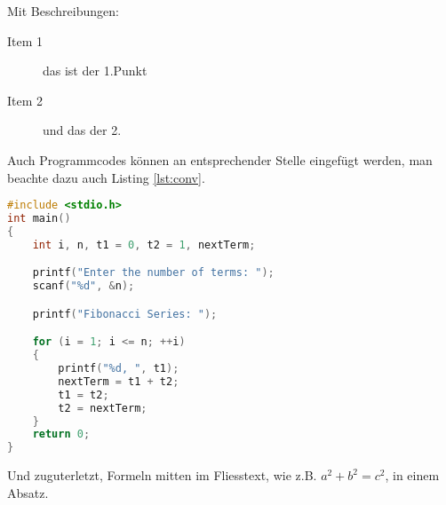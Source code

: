 Mit Beschreibungen:

\begin{description}
    \item[Item 1] das ist der 1.Punkt
    \item[Item 2] und das der 2.
\end{description}


Auch Programmcodes können an entsprechender Stelle eingefügt werden, man beachte dazu auch Listing \ref{lst:conv}.


\begin{lstlisting}[frame=lines, caption=Simple Listing, captionpos=b, label = lst:conv, language=C, showstringspaces=false]
#include <stdio.h>
int main()
{
	int i, n, t1 = 0, t2 = 1, nextTerm;

	printf("Enter the number of terms: ");
	scanf("%d", &n);

	printf("Fibonacci Series: ");

	for (i = 1; i <= n; ++i)
	{
		printf("%d, ", t1);
		nextTerm = t1 + t2;
		t1 = t2;
		t2 = nextTerm;
	}
	return 0;
}
\end{lstlisting}

Und zuguterletzt, Formeln mitten im Fliesstext, wie z.B. $a^2+b^2=c^2$, in einem Absatz.
